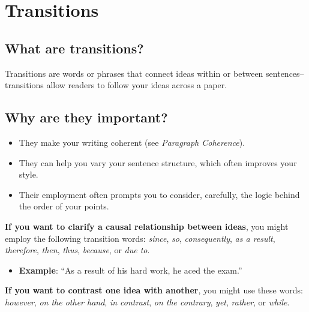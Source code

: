 

\chapter{Transitions}

\section {What are transitions?}

Transitions are words or phrases that connect ideas within or between sentences--transitions allow readers to follow your ideas across a paper.

\section{Why are they important?}

\begin{itemize}
\item They make your writing coherent (see \emph{Paragraph Coherence}). 

\item They can help you vary your sentence structure, which often improves your style.

\item Their employment often prompts you to consider, carefully, the logic behind the order of your points.

\end{itemize}
         

\textbf{If you want to clarify a causal relationship between ideas}, you might employ the following transition words: \emph{since}, \emph{so}, \emph{consequently}, \emph{as a result}, \emph{therefore}, \emph{then}, \emph{thus}, \emph{because}, or \emph{due to}.
 
 \begin{itemize}
	\item \textbf{Example}: ``As a result of his hard work, he aced the exam.''
\end{itemize}

\textbf{If you want to contrast one idea with another}, you might use these words: \emph{however}, \emph{on the other hand}, \emph{in contrast}, \emph{on the contrary}, \emph{yet}, \emph{rather}, or \emph{while}.

